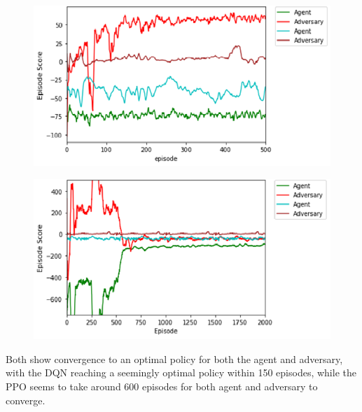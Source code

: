 \documentclass{article}
\begin{document}
\begin{figure}[!ht]
  \centering
  \begin{minipage}{.5\linewidth} 
    \centering
    \includegraphics[width=\linewidth]{simple_push_DQN.png}
    \label{fig:DQNPUSH}
  \end{minipage}%
  \begin{minipage}{.5\linewidth}
    \centering
    \includegraphics[width=\linewidth]{simple_push_PPO.png}
    \label{fig:PPOPUSH}
  \end{minipage}
\end{figure}


Both show convergence to an optimal policy for both the agent and adversary, with the DQN reaching a seemingly optimal policy within 150 episodes, while the PPO seems to take around 600 episodes for both agent and adversary to converge.
\end{document}
